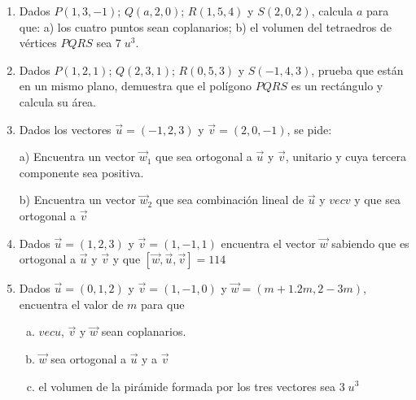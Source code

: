 \begin{enumerate}
\vspace{2mm}

\item Dados $P(1,3,-1)$; $Q(a,2,0)$; $R(1,5,4)$ y $S(2,0,2)$, calcula $a$ para que: a) los cuatro puntos sean coplanarios; b) el volumen del tetraedros de vértices $PQRS$ sea $7\;u^3$.

\vspace{2mm}

\item Dados $P(1,2,1)$; $Q(2,3,1)$; $R(0,5,3)$ y $S(-1,4,3)$, prueba que están en un mismo plano, demuestra que el polígono $PQRS$ es un rectángulo y calcula su área.

\vspace{2mm}

\item Dados los vectores $\vec u=(-1,2,3)$ y $\vec v=(2,0,-1)$, se pide:

a) Encuentra un vector $\vec w_1$  que sea ortogonal a $\vec u$ y $\vec v$, unitario y cuya tercera componente sea positiva.

b) Encuentra un vector $\vec w_2$ que sea combinación lineal de $\vec u$ y $vec v$ y que sea ortogonal a $\vec v$

\vspace{2mm}


\item Dados $\vec u=(1,2,3)$ y $\vec v=(1,-1,1)$ encuentra el vector $\vec w$ sabiendo que es ortogonal a $\vec u$ y $\vec v$ y que $[\vec w, \vec u, \vec v]=114$

\vspace{2mm}

\item Dados $\vec u=(0,1,2)$ y $\vec v=(1,-1,0)$ y $\vec w=(m+1.2m,2-3m)$, encuentra el valor de $m$ para que
\begin{multicols}{2}
\begin{enumerate}[a) ]
\item $vec u$, $\vec v$ y $\vec w$ sean coplanarios.
\item $\vec w$ sea ortogonal a $\vec u$ y a $\vec v$
\item el volumen de la pirámide formada por los tres vectores sea $3\; u^3$
\end{enumerate}
\end{multicols}


\end{enumerate}
